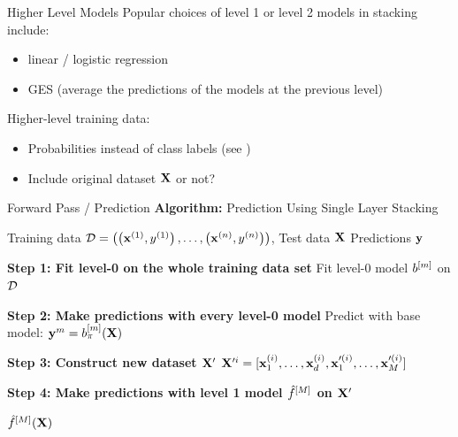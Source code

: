 \documentclass[11pt,compress,t,notes=noshow, xcolor=table]{beamer}
\begin{document}
\begin{vbframe}{Higher Level Models}
\vfill
Popular choices of level 1 or level 2 models in stacking include:
\begin{itemize}
    \item linear / logistic regression 
    \item GES (average the predictions of the models at the previous level)
\end{itemize}
\vfill
Higher-level training data:
\begin{itemize}
    \item Probabilities instead of class labels (see )
    \item Include original dataset $\Xmat$ or not?
\end{itemize}
\vfill
\end{vbframe}


\begin{vbframe}{Forward Pass / Prediction}
\textbf{Algorithm:} Prediction Using Single Layer Stacking
\begin{algorithmic}
    \State
    \Require Training data $\D = \Dset$, Test data $\Xmat$
    \Ensure Predictions $\yv$

    \State \textbf{Step 1: Fit level-0 on the whole training data set}
        \State Fit level-0 model $\bl[m]$ on $\D$
    \EndFor
    
    \State
    \State \textbf{Step 2: Make predictions with every level-0 model}
        \State Predict with base model: $\yv^m = \sbl[m](\Xmat)$
    \EndFor
    
    \State
    \State \textbf{Step 3: Construct new dataset $\Xmat^\prime$}
        \State $\Xmat^{\prime{i}} = [\xi[i]_1, \dots, \xi[i]_d, \xv^{\prime{(i)}}_1, \dots, \xv^{\prime{(i)}}_M] $
    \EndFor
    
    \State
    \State \textbf{Step 4: Make predictions with level 1 model $\fM$ on $\Xmat^\prime$}
    
    \State \Return $\fM(\Xmat)$
\end{algorithmic}

\end{vbframe}
\end{document}
